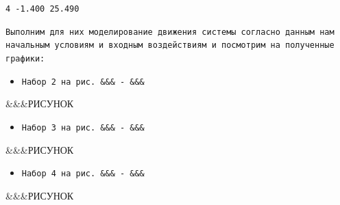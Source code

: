 \begin{par}
\begin{flushleft}
\texttt{4  -1.400	 25.490}
\end{flushleft}
\end{par}

\begin{par}
\begin{flushleft}
\texttt{Выполним для них моделирование движения системы согласно данным нам начальным условиям и входным воздействиям и посмотрим на полученные графики:}
\end{flushleft}
\end{par}

\begin{itemize}
\setlength{\itemsep}{-1ex}
   \item{\begin{flushleft} \texttt{Набор 2 на рис. \&\&\& - \&\&\&} \end{flushleft}}
\end{itemize}

\begin{par}
\begin{flushleft}
\&\&\&РИСУНОК
\end{flushleft}
\end{par}

\begin{itemize}
\setlength{\itemsep}{-1ex}
   \item{\begin{flushleft} \texttt{Набор 3 на рис. \&\&\& - \&\&\&} \end{flushleft}}
\end{itemize}

\begin{par}
\begin{flushleft}
\&\&\&РИСУНОК
\end{flushleft}
\end{par}

\begin{itemize}
\setlength{\itemsep}{-1ex}
   \item{\begin{flushleft} \texttt{Набор 4 на рис. \&\&\& - \&\&\&} \end{flushleft}}
\end{itemize}

\begin{par}
\begin{flushleft}
\&\&\&РИСУНОК
\end{flushleft}
\end{par}

